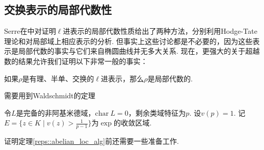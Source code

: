 \subsection{交换表示的局部代数性}

Serre在\cite{serre1997abelian}中对证明$\ell$进表示的局部代数性质给出了两种方法，分别利用Hodge-Tate理论和对局部域上相应表示的分析. 但事实上这些讨论都是不必要的，因为这些表示是局部代数的事实与它们来自椭圆曲线并无多大关系. 现在，更强大的关于超越数的结果允许我们证明以下非常一般的事实：

\begin{cthm}
    如果$\rho$是有理、半单、交换的$\ell$进表示，那么$\rho$是局部代数的. \label{reps::abelian_loc_alg}
\end{cthm}

需要用到Waldschmidt的定理

\begin{cthm}
    令$L$是完备的非阿基米德域，$\mathrm{char}\ L = 0$，剩余类域特征为$p$. 设$v(p) = 1$. 记$E=\{z\in K\mid v(z) > \frac{1}{p-1}\}$为$\exp$的收敛区域. 
\end{cthm}

证明定理\ref{reps::abelian_loc_alg}前还需要一些准备工作.
